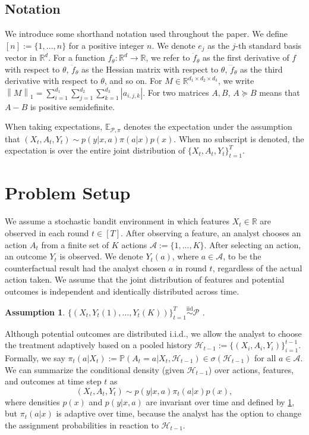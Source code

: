\documentclass[11pt]{article}
\newcommand{\E}{\mathbb{E}}
\newcommand{\R}{\mathbb{R}}
\newcommand{\norm}[1]{\left\lVert#1\right\rVert}
\newtheorem{assumption}{Assumption}
\begin{document}
\subsection{Notation}
We introduce some shorthand notation used throughout the paper. We define $[n] := \{1,...,n\}$ for a positive integer $n$. We denote $e_{j}$ as the $j$-th standard basis vector in $\R^{d}$. For a function $f_{\theta} : \R^{d} \rightarrow \R$, we refer to $\dot{f}_{\theta}$ as the first derivative of $f$ with respect to $\theta$, $\ddot{f}_{\theta}$ as the Hessian matrix with respect to $\theta$, $\dddot{f}_{\theta}$ as the third derivative with respect to $\theta$, and so on. For $M\in \R^{d_1 \times d_2 \times d_3}$, we write $\norm{M}_{1} = \sum_{i=1}^{d_{1}}\sum_{j=1}^{d_2}\sum_{k=1}^{d_3}|a_{i,j,k}|$.
For two matrices $A,B$, $A \succeq B$ means that $A-B$ is positive semidefinite. 


When taking expectations, $\E_{\mathcal{P},\pi}$ denotes the expectation under the assumption that $(X_t,A_t,Y_t) \sim  p \left(y | x, a\right)\pi(a|x) p(x)$. When no subscript is denoted, the expectation is over the entire joint distribution of $\{X_t,A_t,Y_t\}_{t=1}^{T}$. 

\section{Problem Setup} \label{sec:problem}

We assume a stochastic bandit environment in which features $X_{t} \in \mathbb{R}$ are observed in each round $t\in [T]$. After observing a feature, an analyst chooses an action $A_{t}$ from a finite set of $K$ actions $\mathcal{A}:= \{1,...,K\}$. After selecting an action, an outcome $Y_{t}$ is observed. We denote $Y_{t}(a)$, where $a \in \mathcal{A}$, to be the counterfactual result had the analyst chosen $a$ in round $t$, regardless of the actual action taken. We assume that the joint distribution of features and potential outcomes is independent and identically distributed across time. 

\begin{assumption} \label{assumption:potential_outcomes}
$\{(X_{t}, Y_{t}(1), \ldots, Y_t(K))\}_{t=1}^{T} \overset{\mathrm{iid}}{\sim}  \mathcal{P}$ .
\end{assumption}

Although potential outcomes are distributed i.i.d., we allow the analyst to choose the treatment adaptively based on a pooled history $\mathcal{H}_{t-1} := \{ (X_{i},A_{i},Y_{i}) \}_{i=1}^{t-1}$. Formally, we say $\pi_{t}(a|X_{t}) := \mathbb{P} (A_{t} =a | X_{t}, \mathcal{H}_{t-1}) \in \sigma(\mathcal{H}_{t-1}) $ for all $a \in \mathcal{A}$. We can summarize the conditional density (given $\mathcal{H}_{t-1}$) over actions, features, and outcomes at time step $t$ as
\begin{equation} \label{eqn:distribution}
    (X_t, A_t,Y_t) \sim p \left(y | x, a\right)\pi_{t}(a|x)  p(x),
\end{equation}
where densities $p(x)$ and $p(y|x,a)$ are invariant over time and defined by \cref{assumption:potential_outcomes}, but $\pi_{t}(a|x)$ is adaptive over time, because the analyst has the option to change the assignment probabilities in reaction to $\mathcal{H}_{t-1}$. 
\end{document}
